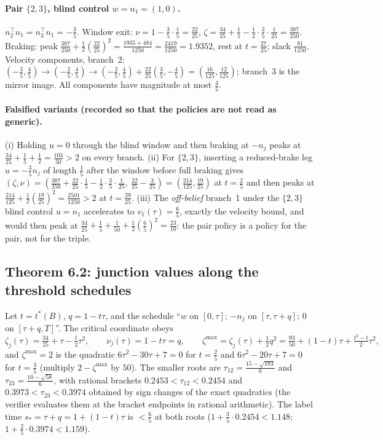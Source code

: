 \documentclass[11pt,a4paper]{article}
\theoremstyle{plain}
\theoremstyle{definition}
\theoremstyle{remark}
\newcommand{\tfr}[2]{\tfrac{#1}{#2}}
\begin{document}
\paragraph{Pair $\{2,3\}$, blind control $w=n_1=(1,0)$.}
$n_2^\top n_1=n_3^\top n_1=-\tfr35$. Window exit: $\nu=1-\tfr35\cdot\tfr15=\tfr{22}{25}$, $\zeta=\tfr{34}{25}+\tfr15-\tfrac12\cdot\tfr35\cdot\tfr1{25}=\tfr{387}{250}$. Braking: peak $\tfr{387}{250}+\tfrac12(\tfr{22}{25})^2=\tfr{1935+484}{1250}=\tfr{2419}{1250}=1.9352$, rest at $t=\tfr{27}{25}$; slack $\tfr{81}{1250}$. Velocity components, branch~2: $(-\tfr35,\tfr45)\to(-\tfr25,\tfr45)\to(-\tfr25,\tfr45)+\tfr{22}{25}(\tfr35,-\tfr45)=(\tfr{16}{125},\tfr{12}{125})$; branch~3 is the mirror image. All components have magnitude at most $\tfr45$.

\paragraph{Falsified variants (recorded so that the policies are not read as generic).}
(i) Holding $u=0$ through the blind window and then braking at $-n_j$ peaks at $\tfr{34}{25}+\tfr15+\tfr12=\tfr{103}{50}>2$ on every branch. (ii) For $\{2,3\}$, inserting a reduced-brake leg $u=-\tfr35n_j$ of length $\tfr15$ after the window before full braking gives $(\zeta,\nu)=(\tfr{387}{250}+\tfr{22}{25}\cdot\tfr15-\tfrac12\cdot\tfr35\cdot\tfr1{25},\ \tfr{22}{25}-\tfr3{25})=(\tfr{214}{125},\tfr{19}{25})$ at $t=\tfr25$ and then peaks at $\tfr{214}{125}+\tfrac12(\tfr{19}{25})^2=\tfr{2501}{1250}>2$ at $t=\tfr{29}{25}$. (iii) The \emph{off-belief} branch~1 under the $\{2,3\}$ blind control $u=n_1$ accelerates to $v_1(\tau)=\tfr65$, exactly the velocity bound, and would then peak at $\tfr{34}{25}+\tfr15+\tfr1{50}+\tfr12(\tfr65)^2=\tfr{23}{10}$: the pair policy is a policy for the pair, not for the triple.

\subsection{Theorem 6.2: junction values along the threshold schedules}

Let $t=t^\ast(B)$, $q=1-t\tau$, and the schedule ``$w$ on $[0,\tau]$; $-n_j$ on $[\tau,\tau+q]$; $0$ on $[\tau+q,T]$''. The critical coordinate obeys
\[
\zeta_j(\tau)=\tfr{34}{25}+\tau-\tfrac t2\tau^2,\qquad\nu_j(\tau)=1-t\tau=q,\qquad\zeta^{\max}=\zeta_j(\tau)+\tfrac12q^2=\tfr{93}{50}+(1-t)\tau+\tfrac{t^2-t}2\tau^2 ,
\]
and $\zeta^{\max}=2$ is the quadratic $6\tau^2-30\tau+7=0$ for $t=\tfr25$ and $6\tau^2-20\tau+7=0$ for $t=\tfr35$ (multiply $2-\zeta^{\max}$ by $50$). The smaller roots are $\tau_{12}=\tfr{15-\sqrt{183}}6$ and $\tau_{23}=\tfr{10-\sqrt{58}}6$, with rational brackets $0.2453<\tau_{12}<0.2454$ and $0.3973<\tau_{23}<0.3974$ obtained by sign changes of the exact quadratics (the verifier evaluates them at the bracket endpoints in rational arithmetic). The label time $s_\ast=\tau+q=1+(1-t)\tau$ is $<\tfr65$ at both roots ($1+\tfr35\cdot0.2454<1.148$; $1+\tfr25\cdot0.3974<1.159$).
\end{document}
